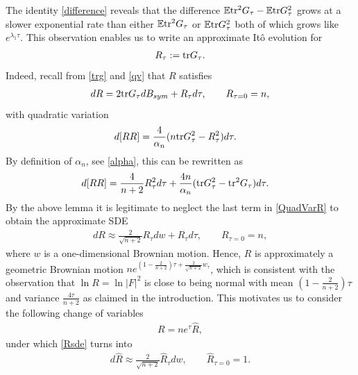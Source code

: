 \documentclass[english, letterpaper,12pt,reqno]{amsart}
\theoremstyle{remark}
\theoremstyle{plain}
\newcommand{\1}{\mathbf{1}}
\def\bbE{\mathbb E}
\def\tr{{\rm tr}}
\begin{document}
\medskip\noindent
The identity \eqref{difference} reveals that the difference $\bbE \tr^2 G_\tau - \bbE \tr G^2_\tau$ grows at a slower exponential rate than either $\bbE \tr^2 G_\tau$ or $\bbE \tr G^2_\tau$ both of which grows like $e^{\lambda_1\tau}$.  This observation enables us to write an approximate Itô evolution for 
\begin{align}\label{R}
    R_\tau:=\tr G_\tau.
\end{align}
Indeed, recall from \eqref{trg} and \eqref{qv} that $R$ satisfies  \begin{align}
dR=2\tr G_\tau dB_{sym}+R_\tau d\tau, \quad \quad R_{\tau=0}=n ,\label{RSDE}
\end{align}
    with quadratic variation \begin{align*}
        d[RR]&=\frac{4}{\alpha_n}(n\tr G_\tau^2-R^2_\tau)d\tau .
    \end{align*}
   By definition of $\alpha_n$, see \eqref{alpha}, this
   can be rewritten as
\begin{align}\label{QuadVarR}
        d[RR]&=\frac{4}{n+2}R_\tau^2 d\tau+\frac{4n}{\alpha_n} (\tr G_\tau^2-\tr^2 G_\tau)d\tau .   \end{align}
        By the above lemma it is legitimate to neglect the last term in \eqref{QuadVarR} to obtain the approximate SDE
      \begin{align}\label{Rsde}
    dR \approx \frac{2}{\sqrt{n+2}} R_\tau dw+R_{\tau}d\tau, \quad \quad R_{\tau=0}=n,
\end{align}
where $w$ is a one-dimensional Brownian motion. Hence, $R$ is approximately a geometric Brownian motion $ ne^{(1-\frac{2}{n+2})\tau +\frac{2}{\sqrt{n+2}} w_\tau}$, which is consistent with the observation that $\ln R=\ln |F|^2$ is close to being normal with mean $(1-\frac{2}{n+2})\tau$ and variance $\frac{4\tau}{n+2}$ as claimed in the introduction. This motivates us to consider the following change of variables
% 
\begin{align}\label{Rhat}
  R=n e^{\tau} \hat R ,
\end{align}
under which \eqref{Rsde} turns into
 \begin{align}\label{Rhatapprox}
   d\hat R \approx \frac{2}{\sqrt{n+2}}\hat R_{ \tau} dw, \quad \quad \hat R_{ \tau=0}=1. 
\end{align}
%
\medskip
\end{document}
